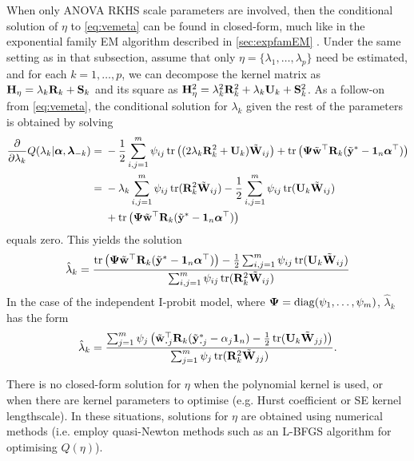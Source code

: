 When only ANOVA RKHS scale parameters are involved, then the conditional solution of $\eta$ to \cref{eq:vemeta} can be found in closed-form, much like in the exponential family EM algorithm described in \cref{sec:expfamEM} .
Under the same setting as in that subsection, assume that only $\eta = \{\lambda_1,\dots,\lambda_p\}$ need be estimated, and for each $k=1,\dots,p$, we can decompose the kernel matrix as ${\mathbf H}_\eta = \lambda_k {\mathbf R}_k + {\mathbf S}_k$ and its square as ${\mathbf H}_\eta^2 = \lambda_k^2 {\mathbf R}_k^2 + \lambda_k {\mathbf U}_k + {\mathbf S}_k^2$.
As a follow-on from \cref{eq:vemeta}, the conditional solution for $\lambda_k$ given the rest of the parameters is obtained by solving
\begin{align*}
  \frac{\partial}{\partial\lambda_k}Q(\lambda_k|{\bm\alpha},{\bm\lambda}_{-k})
  ={}& -\frac{1}{2} \sum_{i,j=1}^m \psi_{ij} \operatorname{tr} \left( (2\lambda_k{\mathbf R}_k^2 + {\mathbf U}_k) \tilde{{\mathbf W}}_{ij} \right) 
  + \operatorname{tr}\left( {\bm\Psi} \tilde{{\mathbf w}}^\top {\mathbf R}_k (\tilde{{\mathbf y}}^* - {\mathbf 1}_n{\bm\alpha}^\top)  \right) \\
  ={}& - \lambda_k \sum_{i,j=1}^m \psi_{ij} \operatorname{tr}({\mathbf R}_k^2\tilde{{\mathbf W}}_{ij})
  - \frac{1}{2} \sum_{i,j=1}^m \psi_{ij} \operatorname{tr}({\mathbf U}_k\tilde{{\mathbf W}}_{ij}) \\
  &+ \operatorname{tr}\left( {\bm\Psi} \tilde{{\mathbf w}}^\top {\mathbf R}_k (\tilde{{\mathbf y}}^* - {\mathbf 1}_n{\bm\alpha}^\top)  \right) 
\end{align*} 
equals zero.
This yields the solution
\[
  \hat\lambda_k 
  = \frac{
  \operatorname{tr}\left( {\bm\Psi} \tilde{{\mathbf w}}^\top {\mathbf R}_k (\tilde{{\mathbf y}}^* - {\mathbf 1}_n{\bm\alpha}^\top) \right)
  - \frac{1}{2} \sum_{i,j=1}^m \psi_{ij} \operatorname{tr}({\mathbf U}_k\tilde{{\mathbf W}}_{ij})
  }{
  \sum_{i,j=1}^m \psi_{ij} \operatorname{tr}({\mathbf R}_k^2\tilde{{\mathbf W}}_{ij})
  }
\]
In the case of the independent I-probit model, where ${\bm\Psi} = \operatorname{diag}(\psi_1,\dots,\psi_m)$, $\hat\lambda_k$ has the form
\[
  \hat\lambda_k
  = \frac{
  \sum_{j=1}^m \psi_j \left( \tilde\bw^\top_{\bigcdot j} \bR_k (\tilde\by^*_{\bigcdot j} - \alpha_j\bone_n) - \half \tr(\bU_k\tilde\bW_{jj})\right)
  }{
  \sum_{j=1}^m \psi_j \tr(\bR_k^2\tilde\bW_{jj})
  }.
\]

\begin{remark}
  There is no closed-form solution for $\eta$ when the polynomial kernel is used, or when there are kernel parameters to optimise (e.g. Hurst coefficient or SE kernel lengthscale).
  In these situations, solutions for $\eta$ are obtained using numerical methods (i.e. employ quasi-Newton methods such as an L-BFGS algorithm  for optimising $Q(\eta)$).
\end{remark}

